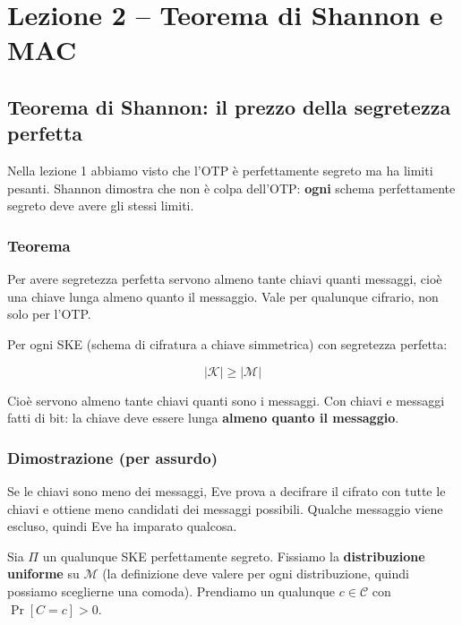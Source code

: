 
\chapter{Lezione 2 -- Teorema di Shannon e MAC}

\section{Teorema di Shannon: il prezzo della segretezza perfetta}

Nella lezione 1 abbiamo visto che l'OTP è perfettamente segreto ma ha limiti pesanti. Shannon dimostra che non è colpa dell'OTP: \textbf{ogni} schema perfettamente segreto deve avere gli stessi limiti.

\subsection{Teorema}

\begin{inbreve}

Per avere segretezza perfetta servono almeno tante chiavi quanti messaggi, cioè una chiave lunga almeno quanto il messaggio. Vale per qualunque cifrario, non solo per l'OTP.

\end{inbreve}

Per ogni SKE (schema di cifratura a chiave simmetrica) con segretezza perfetta:

\[
|\mathcal{K}| \ge |\mathcal{M}|
\]

Cioè servono almeno tante chiavi quanti sono i messaggi. Con chiavi e messaggi fatti di bit: la chiave deve essere lunga \textbf{almeno quanto il messaggio}.

\subsection{Dimostrazione (per assurdo)}

\begin{inbreve}

Se le chiavi sono meno dei messaggi, Eve prova a decifrare il cifrato con tutte le chiavi e ottiene meno candidati dei messaggi possibili. Qualche messaggio viene escluso, quindi Eve ha imparato qualcosa.

\end{inbreve}

Sia \(\Pi\) un qualunque SKE perfettamente segreto. Fissiamo la \textbf{distribuzione uniforme} su \(\mathcal{M}\) (la definizione deve valere per ogni distribuzione, quindi possiamo sceglierne una comoda). Prendiamo un qualunque \(c \in \mathcal{C}\) con \(\Pr[C = c] > 0\).


